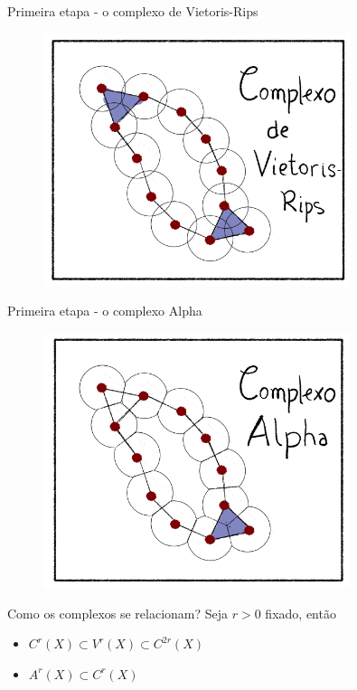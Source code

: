 \documentclass[10pt]{beamer}
\begin{document}
\begin{frame}{Primeira etapa - o complexo de Vietoris-Rips}
    \begin{figure}
        \centering
        \includegraphics[width=0.8\textwidth]{../images/ComplexRips.png}
    \end{figure}   
\end{frame}

\begin{frame}{Primeira etapa - o complexo Alpha}
    \begin{figure}
        \centering
        \includegraphics[width=0.8\textwidth]{../images/ComplexAlpha.png}
    \end{figure}   
\end{frame}

\begin{frame}{Como os complexos se relacionam?}
    Seja $r > 0$ fixado, então
    \begin{itemize}
        \item $C^r(X) \subset V^r(X) \subset C^{2r}(X)$
        \item $A^r(X) \subset C^r(X)$
    \end{itemize} 
\end{frame}
\end{document}
